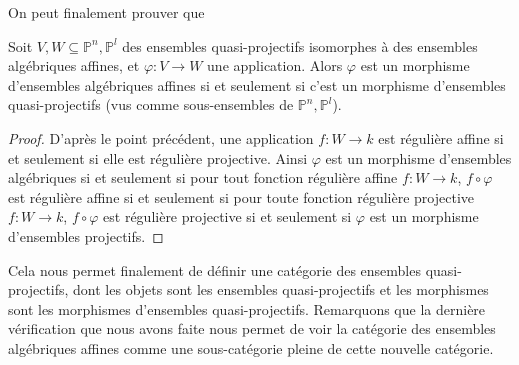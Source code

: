             On peut finalement prouver que
            \begin{prop}
                Soit $V,W \subseteq \mathbb{P}^n, \mathbb{P}^l$ des ensembles quasi-projectifs isomorphes à des ensembles algébriques affines, et $\varphi : V \to W$ une application. Alors $\varphi$ est un morphisme d'ensembles algébriques affines si et seulement si c'est un morphisme d'ensembles quasi-projectifs (vus comme sous-ensembles de $\mathbb{P}^n, \mathbb{P}^l$).
            \end{prop}
            \begin{proof}
                D'après le point précédent, une application $f : W \to k$ est régulière affine si et seulement si elle est régulière projective. Ainsi $\varphi$ est un morphisme d'ensembles algébriques si et seulement si pour tout fonction régulière affine $f : W \to k$, $f \circ \varphi$ est régulière affine si et seulement si pour toute fonction régulière projective $f : W \to k$, $f \circ \varphi$ est régulière projective si et seulement si $\varphi$ est un morphisme d'ensembles projectifs.
            \end{proof}
            Cela nous permet finalement de définir une catégorie des ensembles quasi-projectifs, dont les objets sont les ensembles quasi-projectifs et les morphismes sont les morphismes d'ensembles quasi-projectifs. Remarquons que la dernière vérification que nous avons faite nous permet de voir la catégorie des ensembles algébriques affines comme une sous-catégorie pleine de cette nouvelle catégorie.
